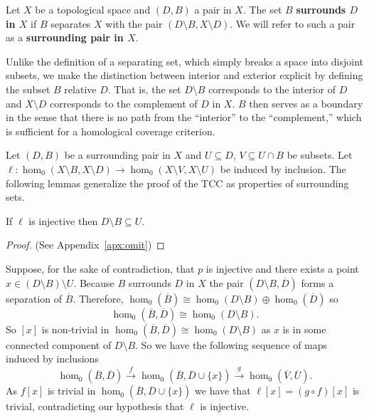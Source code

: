 


\begin{definition}
  Let $X$ be a topological space and $(D,B)$ a pair in $X$.
  The set $B$ \textbf{surrounds $D$ in $X$} if $B$ separates $X$ with the pair $(D\setminus B, X\setminus D)$.
  We will refer to such a pair as a \textbf{surrounding pair in $X$}.
\end{definition}

Unlike the definition of a separating set, which simply breaks a space into disjoint subsets, we make the distinction between interior and exterior explicit by defining the subset $B$ relative $D$.
That is, the set $D\setminus B$ corresponds to the interior of $D$ and $X\setminus D$ corresponds to the complement of $D$ in $X$.
$B$ then serves as a boundary in the sense that there is no path from the ``interior'' to the ``complement,'' which is sufficient for a homological coverage criterion.

Let $(D, B)$ be a surrounding pair in $X$ and $U\subseteq D$, $V\subseteq U\cap B$ be subsets.
Let $\ell: \hom_0(X\setminus B, X\setminus D)\to \hom_0(X\setminus V, X\setminus U)$ be induced by inclusion.
The following lemmas generalize the proof of the TCC as properties of surrounding sets.

\begin{lemma}\label{lem:coverage}
  If $\ell$ is injective then $D\setminus B\subseteq U$.
\end{lemma}
\begin{proof}
  (See Appendix~\ref{apx:omit})
\end{proof}
\proofatend
    Suppose, for the sake of contradiction, that $p$ is injective and there exists a point $x\in (D\setminus B)\setminus U$.
    Because $B$ surrounds $D$ in $X$ the pair $(D\setminus B, \overline{D})$ forms a separation of $\overline{B}$.
    Therefore, $\hom_0(\overline{B})\cong \hom_0(D\setminus B)\oplus \hom_0(\overline{D})$ so
    \[ \hom_0(\overline{B}, \overline{D})\cong \hom_0(D\setminus B). \]
    So $[x]$ is non-trivial in $\hom_0(\overline{B},\overline{D})\cong \hom_0(D\setminus B)$ as $x$ is in some connected component of $D\setminus B$.
    So we have the following sequence of maps induced by inclusions
    \[ \hom_0(\overline{B},\overline{D})\xrightarrow{f} \hom_0(\overline{B},\overline{D}\cup\{x\})\xrightarrow{g} \hom_0(\overline{V},\overline{U}).\]
    As $f[x]$ is trivial in $\hom_0(\overline{B},\overline{D}\cup\{x\})$ we have that $\ell[x] = (g\circ f)[x]$ is trivial, contradicting our hypothesis that $\ell$ is injective.
\endproofatend

